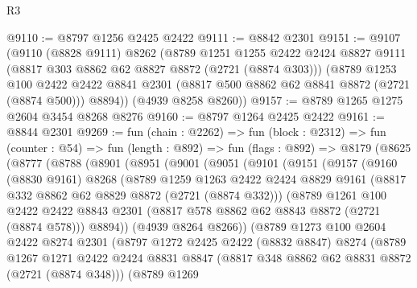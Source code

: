 \begin{lexlean}{R3}
\begin{coremodule}
@9110 := @8797 @1256 @2425 @2422
@9111 := @8842 @2301
@9151 := @9107
    (@9110
      (@8828 @9111)
      @8262
      (@8789
        @1251
        @1255
        @2422
        @2424
        @8827
        @9111
        (@8817 @303 @8862 @62 @8827 @8872 (@2721 (@8874 @303)))
        (@8789
          @1253
          @100
          @2422
          @2422
          @8841
          @2301
          (@8817 @500 @8862 @62 @8841 @8872 (@2721 (@8874 @500)))
          @8894))
      (@4939 @8258 @8260))
@9157 := @8789 @1265 @1275 @2604 @3454 @8268 @8276
@9160 := @8797 @1264 @2425 @2422
@9161 := @8844 @2301
@9269 := fun (chain : @2262) =>
  fun (block : @2312) =>
  fun (counter : @54) =>
  fun (length : @892) =>
  fun (flags : @892) =>
  @8179
    (@8625
      (@8777
        (@8788
          (@8901
            (@8951
              (@9001
                (@9051
                  (@9101
                    (@9151
                      (@9157
                        (@9160
                          (@8830 @9161)
                          @8268
                          (@8789
                            @1259
                            @1263
                            @2422
                            @2424
                            @8829
                            @9161
                            (@8817 @332 @8862 @62 @8829 @8872 (@2721 (@8874 @332)))
                            (@8789
                              @1261
                              @100
                              @2422
                              @2422
                              @8843
                              @2301
                              (@8817 @578 @8862 @62 @8843 @8872 (@2721 (@8874 @578)))
                              @8894))
                          (@4939 @8264 @8266))
                        (@8789
                          @1273
                          @100
                          @2604
                          @2422
                          @8274
                          @2301
                          (@8797
                            @1272
                            @2425
                            @2422
                            (@8832 @8847)
                            @8274
                            (@8789
                              @1267
                              @1271
                              @2422
                              @2424
                              @8831
                              @8847
                              (@8817 @348 @8862 @62 @8831 @8872 (@2721 (@8874 @348)))
                              (@8789
                                @1269

\end{coremodule}
\end{lexlean}
